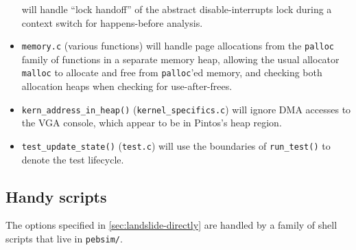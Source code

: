 \begin{itemize}
		will handle ``lock handoff'' of the abstract disable-interrupts lock
		during a context switch for happens-before analysis.
	\item {\tt memory.c} (various functions)
		will handle page allocations from the {\tt palloc} family of functions in a separate memory heap,
		allowing the usual allocator {\tt malloc} to allocate and free from {\tt palloc}'ed memory,
		and checking both allocation heaps when checking for use-after-frees.
	\item {\tt kern\_address\_in\_heap()} ({\tt kernel\_specifics.c})
		will ignore DMA accesses to the VGA console,
		which appear to be in Pintos's heap region.
	\item {\tt test\_update\_state()} ({\tt test.c})
		will use the boundaries of {\tt run\_test()} to denote the test lifecycle.
\end{itemize}


\subsection{Handy scripts}
\label{sec:landslide-glue}

The options specified in \cref{sec:landslide-directly}
are handled by a family of  shell scripts that live in {\tt pebsim/}.

